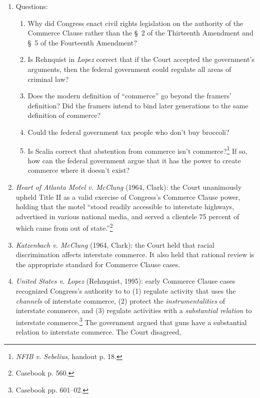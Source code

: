 \begin{enumerate}
    \item Questions:
    \begin{enumerate}
        \item Why did Congress enact civil rights legislation on the authority 
        of the Commerce Clause rather than the \S\ 2 of the Thirteenth 
        Amendment and \S\ 5 of the Fourteenth Amendment?
        \item Is Rehnquist in \emph{Lopez} correct that if the Court accepted 
        the government's arguments, then the federal government could 
        regulate all areas of criminal law?
        \item Does the modern definition of ``commerce'' go beyond the 
        framers' definition? Did the framers intend to bind later generations 
        to the same definition of commerce?
        \item Could the federal government tax people who don't buy broccoli?
        \item Is Scalia correct that abstention from commerce isn't 
        commerce?\footnote{\emph{NFIB v. Sebelius}, handout p. 18.} If so, how 
        can the federal government argue that it has the power to create 
        commerce where it doesn't exist?
    \end{enumerate}
    \item \emph{Heart of Atlanta Motel v. McClung} (1964, Clark): the Court 
    unanimously upheld Title II as a valid exercise of Congress's Commerce 
    Clause power, holding that the motel ``stood readily accessible to 
    interstate highways, advertised in various national media, and served a 
    clientele 75 percent of which came from out of state.''\footnote{Casebook 
    p. 560.}
    \item \emph{Katzenbach v. McClung} (1964, Clark): the Court held that 
    racial discrimination affects interstate commerce. It also held that 
    rational review is the appropriate standard for Commerce Clause cases.
    \item \emph{United States v. Lopez} (Rehnquist, 1995): early Commerce 
    Clause cases recognized Congress's authority to  to (1) regulate activity 
    that uses the \emph{channels} of interstate commerce, (2) protect the 
    \emph{instrumentalities} of interstate commerce, and (3) regulate 
    activities with a \emph{substantial relation} to interstate 
    commerce.\footnote{Casebook pp. 601--02.} The government argued that guns 
    have a substantial relation to interstate commerce. The Court disagreed, 

\end{enumerate}
